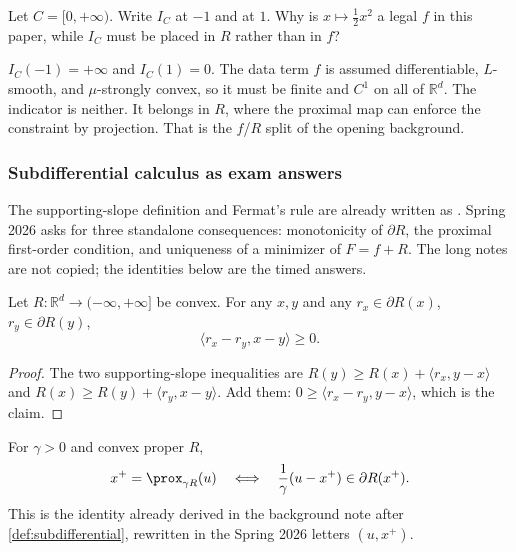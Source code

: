 \begin{exercise}
\label{ex:optu-indicator}
Let $C=[0,+\infty)$. Write $I_C$ at $-1$ and at $1$. Why is $x\mapsto\tfrac12 x^2$ a legal $f$ in this paper, while $I_C$ must be placed in $R$ rather than in $f$?
\end{exercise}

\begin{solution}
$I_C(-1)=+\infty$ and $I_C(1)=0$. The data term $f$ is assumed differentiable, $L$-smooth, and $\mu$-strongly convex, so it must be finite and $C^1$ on all of $\mathbb{R}^d$. The indicator is neither. It belongs in $R$, where the proximal map can enforce the constraint by projection. That is the $f$/$R$ split of the opening background.
\end{solution}


\subsubsection{Subdifferential calculus as exam answers}
\label{subsubsec:optu-subdiff}

The supporting-slope definition and Fermat's rule are already written as . Spring 2026 asks for three standalone consequences: monotonicity of $\partial R$, the proximal first-order condition, and uniqueness of a minimizer of $F=f+R$. The long notes are not copied; the identities below are the timed answers.

\begin{proposition}
\label{prop:optu-mono}
Let $R:\mathbb{R}^d\to(-\infty,+\infty]$ be convex. For any $x,y$ and any $r_x\in\partial R(x)$, $r_y\in\partial R(y)$,
\[
\langle r_x-r_y,x-y\rangle\ge 0.
\]
\end{proposition}

\begin{proof}
The two supporting-slope inequalities are $R(y)\ge R(x)+\langle r_x,y-x\rangle$ and $R(x)\ge R(y)+\langle r_y,x-y\rangle$. Add them: $0\ge\langle r_x-r_y,y-x\rangle$, which is the claim.
\end{proof}

\begin{proposition}
\label{prop:optu-prox-foc}
For $\gamma>0$ and convex proper $R$,
\[
x^+=\prox_{\gamma R}(u)
\quad\Longleftrightarrow\quad
\frac1\gamma(u-x^+)\in\partial R(x^+).
\]
This is the identity already derived in the background note after \cref{def:subdifferential}, rewritten in the Spring 2026 letters $(u,x^+)$.
\end{proposition}

